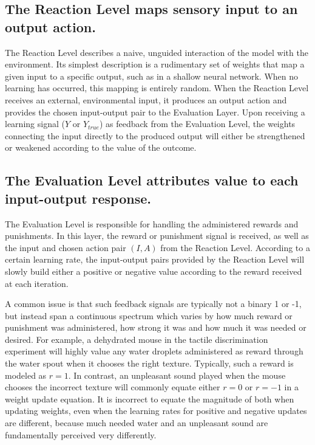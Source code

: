 \documentclass[11pt]{article}
\begin{document}
\subsection{The Reaction Level maps sensory input to an output action.}
The Reaction Level describes a naive, unguided interaction of the model with the environment.  Its simplest description is a rudimentary set of weights that map a given input to a specific output, such as in a shallow neural network.  When no learning has occurred, this mapping is entirely random. When the Reaction Level receives an external, environmental input, it produces an output action and provides the chosen input-output pair to the Evaluation Layer.  Upon receiving a learning signal ($Y$ or $Y_{true}$) as feedback from the Evaluation Level, the weights connecting the input directly to the produced output will either be strengthened or weakened according to the value of the outcome.

\subsection{The Evaluation Level attributes value to each input-output response.}
The Evaluation Level is responsible for handling the administered rewards and punishments.  In this layer, the reward or punishment signal is received, as well as the input and chosen action pair $(I, A)$ from the Reaction Level.  According to a certain learning rate, the input-output pairs provided by the Reaction Level will slowly build either a positive or negative value according to the reward received at each iteration.

A common issue is that such feedback signals are typically not a binary 1 or -1, but instead span a continuous spectrum which varies by how much reward or punishment was administered, how strong it was and how much it was needed or desired.  For example, a dehydrated mouse in the tactile discrimination experiment will highly value any water droplets administered as reward through the water spout when it chooses the right texture.  Typically, such a reward is modeled as $r = 1$.  In contrast, an unpleasant sound played when the mouse chooses the incorrect texture will commonly equate either $r = 0$ or $r = -1$ in a weight update equation.  It is incorrect to equate the magnitude of both when updating weights, even when the learning rates for positive and negative updates are different, because much needed water and an unpleasant sound are fundamentally perceived very differently.
\end{document}
